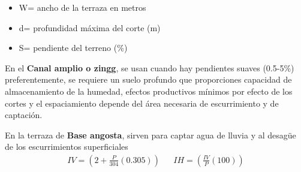     \begin{notation}
        \begin{itemize}
            \item W= ancho de la terraza en metros
            \item d= profundidad máxima del corte (m)
            \item S= pendiente del terreno (\%)
        \end{itemize}
    \end{notation}
    En el \textbf{Canal amplio o zingg}, se usan cuando hay pendientes suaves (0.5-5\%) preferentemente, se requiere un suelo profundo que proporciones capacidad de almacenamiento de la humedad, efectos productivos mínimos por efecto de los cortes y el espaciamiento depende del área necesaria de escurrimiento y de captación.
    
    En la terraza de \textbf{Base angosta}, sirven para captar agua de lluvia y al desagüe de los escurrimientos superficiales
    \begin{align}
        IV =\left(2 + \frac{P}{304}(0.305)\right)&&IH =\left(\frac{IV}{P}(100)\right)
    \end{align}
